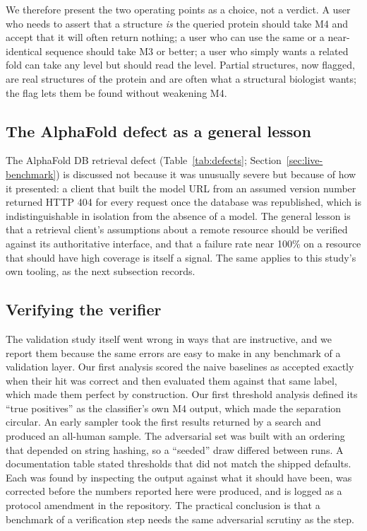 We therefore present the two operating points as a choice, not a verdict. A user
who needs to assert that a structure \emph{is} the queried protein should take M4
and accept that it will often return nothing; a user who can use the same or a
near-identical sequence should take M3 or better; a user who simply wants a
related fold can take any level but should read the level. Partial structures,
now flagged, are real structures of the protein and are often what a
structural biologist wants; the flag lets them be found without weakening M4.

\subsection{The AlphaFold defect as a general lesson}

The AlphaFold DB retrieval defect (Table~\ref{tab:defects};
Section~\ref{sec:live-benchmark}) is discussed not because it was unusually severe
but because of how it presented: a client that built the model URL from an assumed
version number returned HTTP 404 for every request once the database was
republished, which is indistinguishable in isolation from the absence of a model.
The general lesson is that a retrieval client's assumptions about a remote
resource should be verified against its authoritative interface, and that a
failure rate near 100\% on a resource that should have high coverage is itself
a signal. The same applies to this study's own tooling, as the next subsection
records.

\subsection{Verifying the verifier}

The validation study itself went wrong in ways that are instructive, and we
report them because the same errors are easy to make in any benchmark of a
validation layer. Our first analysis scored the naive baselines as accepted
exactly when their hit was correct and then evaluated them against that same
label, which made them perfect by construction. Our first threshold analysis
defined its ``true positives'' as the classifier's own M4 output, which made the
separation circular. An early sampler took the first results returned by a search
and produced an all-human sample. The adversarial set was built with an ordering
that depended on string hashing, so a ``seeded'' draw differed between runs. A
documentation table stated thresholds that did not match the shipped defaults.
Each was found by inspecting the output against what it should have been, was
corrected before the numbers reported here were produced, and is logged as a
protocol amendment in the repository. The practical conclusion is that a
benchmark of a verification step needs the same adversarial scrutiny as the step.

